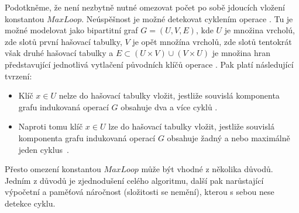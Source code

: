 Podotkněme, že není nezbytně nutné omezovat počet po sobě jdoucích vložení konstantou $MaxLoop$. Neúspěšnost je 
možné detekovat cyklením operace . Tu je možné modelovat jako bipartitní graf $G=(U,V,E)$, 
kde $U$ je množina vrcholú, zde slotů první hašovací tabulky, $V$ je opět množína vrcholů, zde slotů tentokrát však druhé
hašovací tabulky a $E \subset (U \times V) \cup (V \times U)$ je množina hran představující jednotlivá vytlačení původních
klíčů operace . Pak platí následující tvrzení:
\begin{itemize}
	\item Klíč $x \in U$ nelze do hašovací tabulky vložit, jestliže souvislá komponenta grafu indukovaná operací
		 $G$ obsahuje dva a více cyklů
		\cite{standford1}. 
	\item Naproti tomu klíč $x \in U$ lze do hašovací tabulky vložit, jestliže souvislá komponenta grafu indukovaná operací
		 $G$ obsahuje žadný
		a nebo maximálně jeden cyklus~\cite{standford1}.
\end{itemize}
Přesto omezení konstantou $MaxLoop$ může být vhodné z několika důvodů. Jedním z důvodů je zjednodušení celého algoritmu,
další pak narůstající výpočetní a paměťová náročnost (složitosti se nemění), kterou s sebou nese detekce cyklu.

